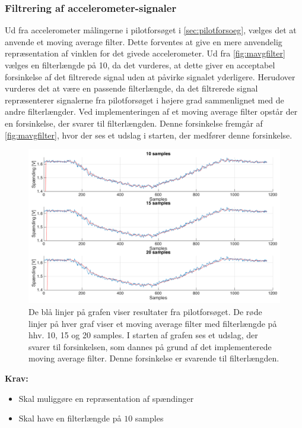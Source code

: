 \subsubsection{Filtrering af accelerometer-signaler} \label{sec:mavg_krav}
Ud fra accelerometer målingerne i pilotforsøget i \autoref{sec:pilotforsoeg}, vælges det at anvende et moving average filter. Dette forventes at give en mere anvendelig repræsentation af vinklen for det givede accelerometer. Ud fra \autoref{fig:mavgfilter} vælges en filterlængde på 10, da det vurderes, at dette giver en acceptabel forsinkelse af det filtrerede signal uden at påvirke signalet yderligere. Herudover vurderes det at være en passende filterlængde, da det filtrerede signal repræsenterer signalerne fra pilotforsøget i højere grad sammenlignet med de andre filterlængder. Ved implementeringen af et moving average filter opstår der en forsinkelse, der svarer til filterlængden. Denne forsinkelse fremgår af \autoref{fig:mavgfilter}, hvor der ses et udslag i starten, der medfører denne forsinkelse. 

\begin{figure} [H]
\centering
\includegraphics[width=1\textwidth]{figures/problemloesning/mavgfilter_matlab} 
\caption{De blå linjer på grafen viser resultater fra pilotforsøget. De røde linjer på hver graf viser et moving average filter med filterlængde på hhv. 10, 15 og 20 samples. I starten af grafen ses et udslag, der svarer til forsinkelsen, som dannes på grund af det implementerede moving average filter. Denne forsinkelse er svarende til filterlængden.}
\label{fig:mavgfilter}
\end{figure}

\vspace{3mm}

\textbf{Krav:}
\begin{itemize}
\item Skal muliggøre en repræsentation af spændinger 
\item Skal have en filterlængde på $10$ samples
\end{itemize}